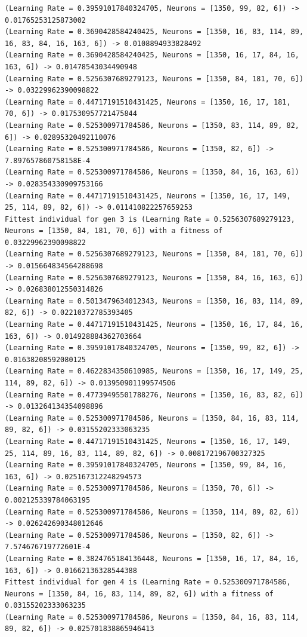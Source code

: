\documentclass{report}
\begin{document}
\begin{verbatim}
(Learning Rate = 0.39591017840324705, Neurons = [1350, 99, 82, 6]) -> 0.01765253125873002
(Learning Rate = 0.3690428584240425, Neurons = [1350, 16, 83, 114, 89, 16, 83, 84, 16, 163, 6]) -> 0.0108894933828492
(Learning Rate = 0.3690428584240425, Neurons = [1350, 16, 17, 84, 16, 163, 6]) -> 0.01478543034490948
(Learning Rate = 0.5256307689279123, Neurons = [1350, 84, 181, 70, 6]) -> 0.03229962390098822
(Learning Rate = 0.44717191510431425, Neurons = [1350, 16, 17, 181, 70, 6]) -> 0.017530957721475844
(Learning Rate = 0.525300971784586, Neurons = [1350, 83, 114, 89, 82, 6]) -> 0.02895320492110076
(Learning Rate = 0.525300971784586, Neurons = [1350, 82, 6]) -> 7.897657860758158E-4
(Learning Rate = 0.525300971784586, Neurons = [1350, 84, 16, 163, 6]) -> 0.028354330909753166
(Learning Rate = 0.44717191510431425, Neurons = [1350, 16, 17, 149, 25, 114, 89, 82, 6]) -> 0.011410822257659253
Fittest individual for gen 3 is (Learning Rate = 0.5256307689279123, Neurons = [1350, 84, 181, 70, 6]) with a fitness of 0.03229962390098822
(Learning Rate = 0.5256307689279123, Neurons = [1350, 84, 181, 70, 6]) -> 0.015664834564288698
(Learning Rate = 0.5256307689279123, Neurons = [1350, 84, 16, 163, 6]) -> 0.026838012550314826
(Learning Rate = 0.5013479634012343, Neurons = [1350, 16, 83, 114, 89, 82, 6]) -> 0.02210372785393405
(Learning Rate = 0.44717191510431425, Neurons = [1350, 16, 17, 84, 16, 163, 6]) -> 0.014928884362703664
(Learning Rate = 0.39591017840324705, Neurons = [1350, 99, 82, 6]) -> 0.01638208592080125
(Learning Rate = 0.4622834350610985, Neurons = [1350, 16, 17, 149, 25, 114, 89, 82, 6]) -> 0.013950901199574506
(Learning Rate = 0.47739495501788276, Neurons = [1350, 16, 83, 82, 6]) -> 0.013264134354098896
(Learning Rate = 0.525300971784586, Neurons = [1350, 84, 16, 83, 114, 89, 82, 6]) -> 0.03155202333063235
(Learning Rate = 0.44717191510431425, Neurons = [1350, 16, 17, 149, 25, 114, 89, 16, 83, 114, 89, 82, 6]) -> 0.008172196700327325
(Learning Rate = 0.39591017840324705, Neurons = [1350, 99, 84, 16, 163, 6]) -> 0.025167312248294573
(Learning Rate = 0.525300971784586, Neurons = [1350, 70, 6]) -> 0.002125339784063195
(Learning Rate = 0.525300971784586, Neurons = [1350, 114, 89, 82, 6]) -> 0.026242690348012646
(Learning Rate = 0.525300971784586, Neurons = [1350, 82, 6]) -> 7.574676719772601E-4
(Learning Rate = 0.3824765184136448, Neurons = [1350, 16, 17, 84, 16, 163, 6]) -> 0.01662136328544388
Fittest individual for gen 4 is (Learning Rate = 0.525300971784586, Neurons = [1350, 84, 16, 83, 114, 89, 82, 6]) with a fitness of 0.03155202333063235
(Learning Rate = 0.525300971784586, Neurons = [1350, 84, 16, 83, 114, 89, 82, 6]) -> 0.025701838865946413

\end{verbatim}
\end{document}
